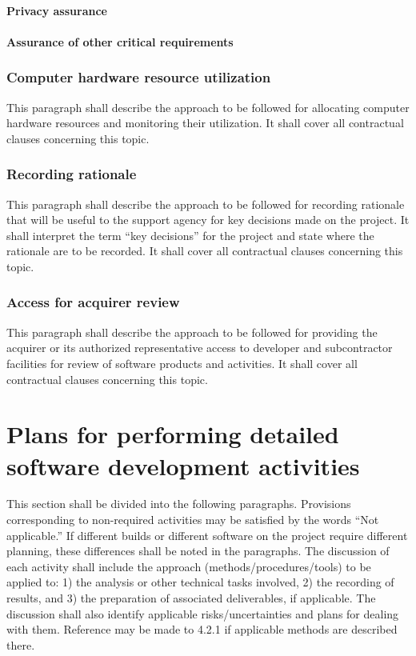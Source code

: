 \paragraph{Privacy assurance}

\paragraph{Assurance of other critical requirements}

\subsubsection{Computer hardware resource utilization}

This paragraph shall describe the approach to be followed for allocating
computer hardware resources and monitoring their utilization. It shall
cover all contractual clauses concerning this topic.

\subsubsection{Recording rationale}

This paragraph shall describe the approach to be followed for recording
rationale that will be useful to the support agency for key decisions
made on the project. It shall interpret the term ``key decisions'' for
the project and state where the rationale are to be recorded. It shall
cover all contractual clauses concerning this topic.

\subsubsection{Access for acquirer review}

This paragraph shall describe the approach to be followed for providing
the acquirer or its authorized representative access to developer and
subcontractor facilities for review of software products and activities.
It shall cover all contractual clauses concerning this topic.

\section{Plans for performing detailed software development
activities}

This section shall be divided into the following paragraphs. Provisions
corresponding to non-required activities may be satisfied by the words
``Not applicable.'' If different builds or different software on the
project require different planning, these differences shall be noted in
the paragraphs. The discussion of each activity shall include the
approach (methods/procedures/tools) to be applied to: 1) the analysis
or other technical tasks involved, 2) the recording of results, and 3)
the preparation of associated deliverables, if applicable. The
discussion shall also identify applicable risks/uncertainties and plans
for dealing with them. Reference may be made to 4.2.1 if applicable
methods are described there.

